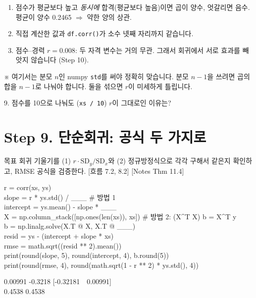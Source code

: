 \documentclass[11pt,a4paper]{article}
\newcommand{\code}[1]{\texttt{#1}}
\newcommand{\aside}[1]{{\footnotesize\color{black!65}#1}}
\newcommand{\Wc}[1]{{\scriptsize\textsf{\color{blue!60!black}[흐름 #1]}}}
\newcommand{\Nc}[1]{{\scriptsize\textsf{\color{violet!70!black}[Notes #1]}}}
\begin{document}
\begin{howbox}
\begin{enumerate}
\item 점수가 평균보다 높고 \emph{동시에} 합격(평균보다 높음)이면 곱이 양수, 엇갈리면 음수. 평균이 양수 0.2465 $\Rightarrow$ 약한 양의 상관.
\item 직접 계산한 값과 \code{df.corr()}가 소수 넷째 자리까지 같습니다.
\item 점수–경력 $r=0.008$: 두 자격 변수는 거의 무관. 그래서 회귀에서 서로 효과를 빼앗지 않습니다 (Step 10).
\end{enumerate}
\end{howbox}
\aside{※ 여기서는 분모 $n$인 numpy \code{std}를 써야 정확히 맞습니다. 분모 $n-1$을 쓰려면 곱의 합을 $n-1$로 나눠야 합니다. 둘을 섞으면 $r$이 미세하게 틀립니다.}

\begin{qbox}
9. 점수를 10으로 나눠도 (\code{xs / 10}) $r$이 그대로인 이유는?
\end{qbox}

\section{Step 9. 단순회귀: 공식 두 가지로}
\begin{goalbox}{목표}
회귀 기울기를 (1) $r\cdot\text{SD}_y/\text{SD}_x$와 (2) 정규방정식으로 각각 구해서 같은지 확인하고, RMSE 공식을 검증한다. \Wc{7.2, 8.2} \Nc{Thm 11.4}
\end{goalbox}

\begin{codebox}
r = corr(xs, ys)\\
slope = r * ys.std() / \_\_\_ \hfill \# 방법 1\\
intercept = ys.mean() - slope * \_\_\_\\[3pt]
X = np.column\_stack([np.ones(len(xs)), xs]) \hfill \# 방법 2: (X\^{}T X) b = X\^{}T y\\
b = np.linalg.solve(X.T @ X, X.T @ \_\_\_)\\[3pt]
resid = ys - (intercept + slope * xs)\\
rmse = math.sqrt((resid ** 2).mean())\\
print(round(slope, 5), round(intercept, 4), b.round(5))\\
print(round(rmse, 4), round(math.sqrt(1 - r ** 2) * ys.std(), 4))
\end{codebox}
\begin{outbox}
0.00991 -0.3218 [-0.32181\ \ 0.00991]\\
0.4538 0.4538
\end{outbox}
\end{document}
